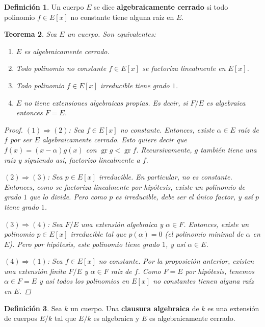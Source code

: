 \documentclass[12pt]{book}
\newtheorem{teo}{Teorema}[section]
\theoremstyle{definition}
\newtheorem{defn}[teo]{Definición}
\DeclareMathOperator{\gr}{gr}
\begin{document}
\begin{defn}
Un cuerpo $E$ se dice \textbf{algebraicamente cerrado} si todo polinomio $f\in E[x]$ no constante tiene alguna raíz en $E$.
\end{defn}

\begin{teo}
Sea $E$ un cuerpo. Son equivalentes:
\begin{enumerate}
\item $E$ es algebraicamente cerrado.
\item Todo polinomio no constante $f\in E[x]$ se factoriza linealmente en $E[x]$.
\item Todo polinomio $f\in E[x]$ irreducible tiene grado $1$.
\item $E$ no tiene extensiones algebraicas propias. Es decir, si $F/E$ es algebraica entonces $F=E$.
\end{enumerate}
\begin{proof}
$(1)\Longrightarrow (2)$: Sea $f\in E[x]$ no constante. Entonces, existe $\alpha\in E$ raíz de $f$ por ser $E$ algebraicamente cerrado. Esto quiere decir que $f(x) = (x-\alpha) g(x)$ con $\gr g < \gr f$. Recursivamente, $g$ también tiene una raíz y siguiendo así, factorizo linealmente a $f$.

$(2)\Longrightarrow (3)$: Sea $p\in E[x]$ irreducible. En particular, no es constante. Entonces, como se factoriza linealmente por hipótesis, existe un polinomio de grado $1$ que lo divide. Pero como $p$ es irreducible, debe ser el único factor, y así $p$ tiene grado $1$.

$(3)\Longrightarrow (4)$: Sea $F/E$ una extensión algebraica y $\alpha\in F$. Entonces, existe un polinomio $p\in E[x]$ irreducible tal que $p(\alpha)=0$ (el polinomio minimal de $\alpha$ en $E$). Pero por hipótesis, este polinomio tiene grado $1$, y así $\alpha\in E$.

$(4)\Longrightarrow (1)$: Sea $f\in E[x]$ no constante. Por la proposición anterior, existen una extensión finita $F/E$ y $\alpha\in F$ raíz de $f$. Como $F=E$ por hipótesis, tenemos $\alpha\in F=E$ y así todos los polinomios en $E[x]$ no constantes tienen alguna raíz en $E$.
\end{proof}
\end{teo}

\begin{defn}
Sea $k$ un cuerpo. Una \textbf{clausura algebraica} de $k$ es una extensión de cuerpos $E/k$ tal que $E/k$ es algebraica y $E$ es algebraicamente cerrado.
\end{defn}
\end{document}
